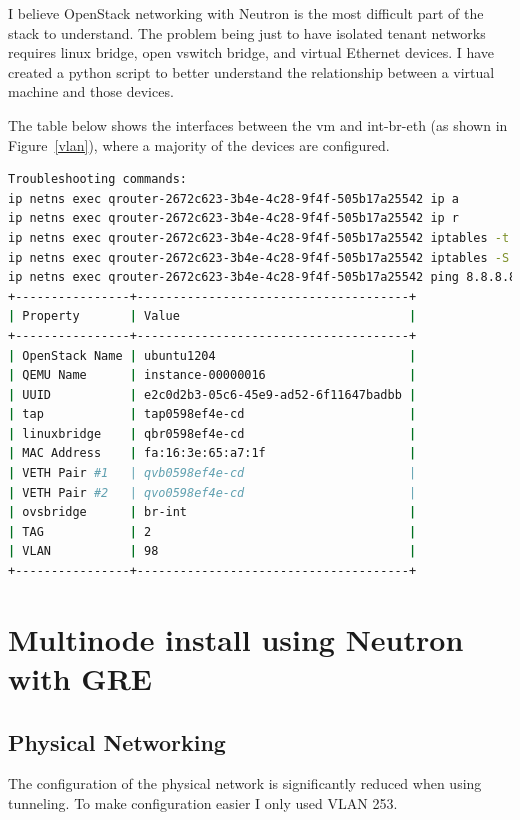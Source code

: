 \documentclass[11pt,letterpaper,oneside]{book}
\begin{document}
I believe OpenStack networking with Neutron is the most difficult part of the stack to understand.  The problem being just to have isolated tenant networks requires linux bridge, open vswitch bridge, and virtual Ethernet devices.  I have created a python script to better understand the relationship between a virtual machine and those devices.

The table below shows the interfaces between the vm and int-br-eth (as shown in Figure~\ref{vlan}), where a majority of the devices are configured.



\begin{lstlisting}[caption={map\_router output},language=bash]
Troubleshooting commands:
ip netns exec qrouter-2672c623-3b4e-4c28-9f4f-505b17a25542 ip a
ip netns exec qrouter-2672c623-3b4e-4c28-9f4f-505b17a25542 ip r
ip netns exec qrouter-2672c623-3b4e-4c28-9f4f-505b17a25542 iptables -t nat -L -nv
ip netns exec qrouter-2672c623-3b4e-4c28-9f4f-505b17a25542 iptables -S -t nat
ip netns exec qrouter-2672c623-3b4e-4c28-9f4f-505b17a25542 ping 8.8.8.8
+----------------+--------------------------------------+
| Property       | Value                                |
+----------------+--------------------------------------+
| OpenStack Name | ubuntu1204                           |
| QEMU Name      | instance-00000016                    |
| UUID           | e2c0d2b3-05c6-45e9-ad52-6f11647badbb |
| tap            | tap0598ef4e-cd                       |
| linuxbridge    | qbr0598ef4e-cd                       |
| MAC Address    | fa:16:3e:65:a7:1f                    |
| VETH Pair #1   | qvb0598ef4e-cd                       |
| VETH Pair #2   | qvo0598ef4e-cd                       |
| ovsbridge      | br-int                               |
| TAG            | 2                                    |
| VLAN           | 98                                   |
+----------------+--------------------------------------+
\end{lstlisting}
\chapter{Multinode install using Neutron with GRE}

\section{Physical Networking}
The configuration of the physical network is significantly reduced when using tunneling.  To make configuration easier I only used VLAN 253.
\end{document}
